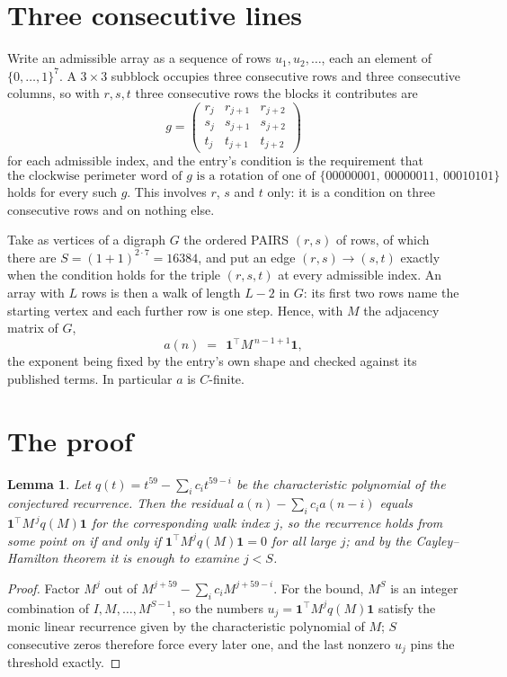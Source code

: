 \documentclass[11pt,a4paper]{article}
\theoremstyle{plain}
\newtheorem{lemma}[theorem]{Lemma}
\theoremstyle{definition}
\begin{document}
\section{Three consecutive lines}

Write an admissible array as a sequence of rows $u_1,u_2,\dots$, each an element of
$\{0,\dots,1\}^{7}$. A $3\times3$ subblock occupies three consecutive rows and
three consecutive columns, so with $r,s,t$ three consecutive rows the blocks it
contributes are
\[
g=\begin{pmatrix}r_j&r_{j+1}&r_{j+2}\\ s_j&s_{j+1}&s_{j+2}\\ t_j&t_{j+1}&t_{j+2}\end{pmatrix}
\]
for each admissible index, and the entry's condition is the requirement that
\[
\text{the clockwise perimeter word of }g\text{ is a rotation of one of }\{00000001,\ 00000011,\ 00010101\}
\]
holds for every such $g$. This involves $r$, $s$ and $t$ only: it is a condition on
three consecutive rows and on nothing else.

Take as vertices of a digraph $G$ the ordered PAIRS $(r,s)$ of rows, of which there are
$S=(1+1)^{2\cdot7}=16384$, and put an edge $(r,s)\to(s,t)$ exactly when the condition
holds for the triple $(r,s,t)$ at every admissible index. An array with $L$ rows is then a
walk of length $L-2$ in $G$: its first two rows name the starting vertex and each further
row is one step. Hence, with $M$ the adjacency matrix of $G$,
\[
a(n)\;=\;\,\mathbf{1}^{\!\top}M^{\,n-1+1}\mathbf{1},
\]
the exponent being fixed by the entry's own shape and checked against its published terms.
In particular $a$ is $C$-finite.

\section{The proof}

\begin{lemma}\label{lem:crit}
Let $q(t)=t^{59}-\sum_i c_it^{59-i}$ be the characteristic polynomial of the
conjectured recurrence. Then the residual $a(n)-\sum_ic_ia(n-i)$ equals
$\mathbf{1}^{\!\top}M^{\,j}q(M)\mathbf{1}$ for the corresponding walk index
$j$, so the recurrence holds from some point on if and only if
$\mathbf{1}^{\!\top}M^{j}q(M)\mathbf{1}=0$ for all large $j$; and by the
Cayley--Hamilton theorem it is enough to examine $j<S$.
\end{lemma}

\begin{proof}
Factor $M^{j}$ out of $M^{j+59}-\sum_ic_iM^{j+59-i}$. For the bound, $M^{S}$
is an integer combination of $I,M,\dots,M^{S-1}$, so the numbers
$u_j=\mathbf{1}^{\!\top}M^{j}q(M)\mathbf{1}$ satisfy the monic linear recurrence given by
the characteristic polynomial of $M$; $S$ consecutive zeros therefore force every later one,
and the last nonzero $u_j$ pins the threshold exactly.
\end{proof}
\end{document}
